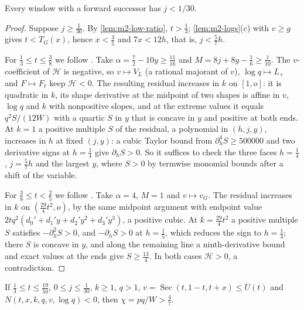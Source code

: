 \begin{lemma}\label{lem:m2-large-gap}
Every window with a forward successor has $j<1/30$.
\end{lemma}

\begin{proof}
Suppose $j\ge\frac1{30}$. By \cref{lem:m2-low-ratio}, $t>\frac13$; \cref{lem:m2-logs}(c) with
$v\ge g$ gives $t<T_G(x)$, hence $x<\frac35$ and $7x<12h$, that is, $j<\frac57h$.

For $\frac13\le t\le\frac38$ we follow
\cite[\texttt{NONSHORT\_\allowbreak LOW\_\allowbreak T\_\allowbreak CALLER}]{LighterProofs}. Take
$\alpha=\frac72-10y\ge\frac{11}{16}$ and $M=8j+8y-\frac16\ge\frac1{10}$. The $v$-coefficient of $\mathcal H$
is negative, so $v\mapsto V_L$ (a rational majorant of $v$), $\log q\mapsto L_+$ and $F\mapsto F_\ell$
keep $\mathcal H<0$. The resulting residual increases in $k$ on $[1,o]$: it is quadratic in $k$,
its shape derivative at the midpoint of two shapes is affine in $v$, $\log q$ and $k$ with
nonpositive slopes, and at the extreme values it equals $q^2S/(12W)$ with a quartic $S$ in $y$ that
is concave in $y$ and positive at both ends. At $k=1$ a positive multiple $S$ of the residual, a
polynomial in $(h,j,y)$, increases in $h$ at fixed $(j,y)$: a cubic Taylor bound from
$\partial_h^4S\ge500000$ and two derivative signs at $h=\frac14$ give $\partial_hS>0$. So it suffices to
check the three faces $h=\frac14$, $j=\frac57h$ and the largest $y$, where $S>0$ by termwise monomial
bounds after a shift of the variable.

For $\frac38\le t<\frac25$ we follow
\cite[\texttt{NONSHORT\_\allowbreak HIGH\_\allowbreak RATIO\_\allowbreak SHAPE},
\texttt{NONSHORT\_\allowbreak HIGH\_\allowbreak RATIO\_\allowbreak LOWER\_\allowbreak REDUCTION}]{LighterProofs}.
Take $\alpha=4$, $M=1$ and $v\mapsto v_G$. The residual increases in $k$ on $(\frac{29}4t^2,o)$, by the
same midpoint argument with endpoint value $2tq^2(d_0'+d_1'y+d_2'y^2+d_3'y^3)$, a positive cubic.
At $k=\frac{29}4t^2$ a positive multiple $S$ satisfies $-\partial_h^2S>0$, and $-\partial_hS>0$ at
$h=\frac15$, which reduces the sign to $h=\frac14$; there $S$ is concave in $y$, and along the remaining
line a ninth-derivative bound and exact values at the ends give $S\ge\frac{13}4$. In both cases
$\mathcal H>0$, a contradiction.
\end{proof}

\begin{lemma}\label{lem:m2-chi}
If $\frac13\le t\le\frac{19}{50}$, $0\le j\le\frac1{30}$, $k\ge1$, $q>1$,
$v=\operatorname{Sec}(t,1-t,t+x)\le U(t)$ and $N(t,x,k,q,v,\log q)<0$, then $\chi=pq/W>\frac47$.
\end{lemma}


